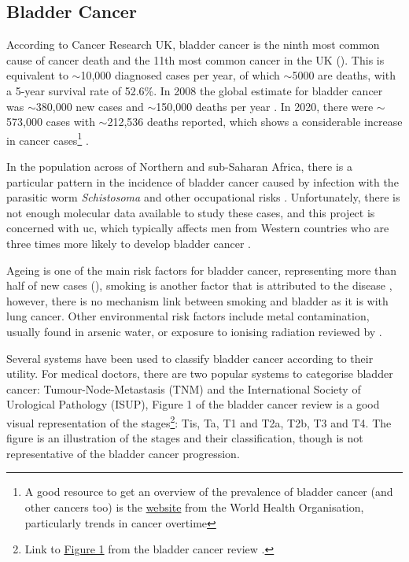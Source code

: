 \subsection{Bladder Cancer} \label{s:lit:bladder_cancer}

According to Cancer Research UK, bladder cancer is the ninth most common cause of cancer death and the 11th most common cancer in the UK (\citeyear{Cancer_Research_UK2015-cf}). This is equivalent to $\sim$10,000 diagnosed cases per year, of which $\sim$5000 are deaths, with a 5-year survival rate of 52.6\%. In 2008 the global estimate for bladder cancer was $\sim$380,000 new cases and $\sim$150,000 deaths per year \citep{Ferlay2010-sx}. In 2020, there were $\sim$573,000 cases with $\sim$212,536 deaths reported, which shows a considerable increase in cancer cases\footnote{A good resource to get an overview of the prevalence of bladder cancer (and other cancers too) is the \href{https://gco.iarc.fr/en}{website} from the World Health Organisation, particularly trends in cancer overtime} \citep{Sung2021-hn}. 

In the population across of Northern and sub-Saharan Africa, there is a particular pattern in the incidence of bladder cancer caused by infection with the parasitic worm \textit{Schistosoma} and other occupational risks \citep{Ferlay2010-sx}. Unfortunately, there is not enough molecular data available to study these cases, and this project is concerned with \acrfull{uc}, which typically affects men from Western countries who are three times more likely to develop bladder cancer \citep{Knowles2015-mu}.
 

Ageing is one of the main risk factors for bladder cancer, representing more than half of new cases (\citeyear{Cancer_Research_UK2015-cf}), smoking is another factor that is attributed to the disease \citep{Knowles2015-mu}, however, there is no mechanism link between smoking and bladder as it is with lung cancer. Other environmental risk factors include metal contamination, usually found in arsenic water, or exposure to ionising radiation reviewed by \citep{Knowles2015-mu}. 

Several systems have been used to classify bladder cancer according to their utility. For medical doctors, there are two popular systems to categorise bladder cancer: Tumour-Node-Metastasis (TNM) and the International Society of Urological Pathology (ISUP), Figure 1 of the bladder cancer review \citep{Knowles2015-mu} is a good visual representation of the stages\footnote{Link to \href{https://www.nature.com/articles/nrc3817/figures/1}{Figure 1} from the bladder cancer review \citep{Knowles2015-mu}.}: Tis, Ta, T1 and T2a, T2b, T3 and T4. The figure is an illustration of the stages and their classification, though is not representative of the bladder cancer progression.


